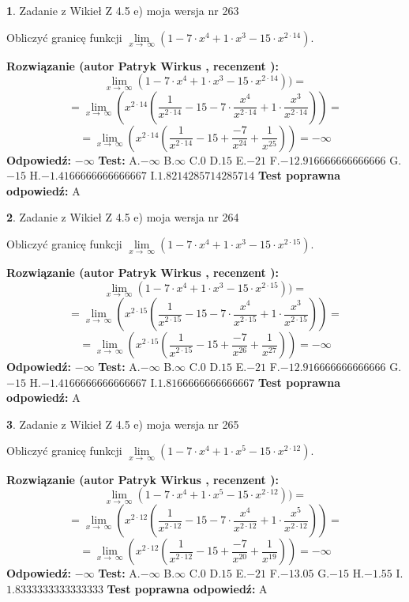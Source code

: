 \documentclass[12pt, a4paper]{article}
\theoremstyle{definition} %
\newtheorem{zad}{}
\newcommand{\zadStart}[1]{\begin{zad}#1\newline}
\newcommand{\zadStop}{\end{zad}}
\newcommand{\rozwStart}[2]{\noindent \textbf{Rozwiązanie (autor #1 , recenzent #2): }\newline}
\newcommand{\rozwStop}{\newline}
\newcommand{\odpStart}{\noindent \textbf{Odpowiedź:}\newline}
\newcommand{\odpStop}{\newline}
\newcommand{\testStart}{\noindent \textbf{Test:}\newline}
\newcommand{\testStop}{\newline}
\newcommand{\kluczStart}{\noindent \textbf{Test poprawna odpowiedź:}\newline}
\newcommand{\kluczStop}{\newline}
\begin{document}
\zadStart{Zadanie z Wikieł Z 4.5 e) moja wersja nr 263}


Obliczyć granicę funkcji  $\lim\limits_{x\to\ \infty}(1 - 7 \cdot x^{4}+1 \cdot x^{3}- 15 \cdot x^{2\cdot14})$.
\zadStop
\rozwStart{Patryk Wirkus}{}
$$\lim\limits_{x\to\ \infty}(1 - 7 \cdot x^{4}+1 \cdot x^{3}- 15 \cdot x^{2\cdot14}))=$$
$$=\lim\limits_{x\to\ \infty}(x^{2\cdot14}(\frac{1}{x^{2\cdot14}}-15 -7 \cdot \frac{x^{4}}{x^{2\cdot14}}+1 \cdot \frac{x^{3}}{x^{2\cdot14}}))=$$
$$=\lim\limits_{x\to\ \infty}(x^{2\cdot14}(\frac{1}{x^{2\cdot14}}-15 + \frac{-7}{x^{24}}+ \frac{1}{x^{25}}))=-\infty$$
\rozwStop
\odpStart
$-\infty$
\odpStop
\testStart
A.$-\infty$ B.$\infty$ C.$0$ D.$15$ E.$-21$
F.$-12.916666666666666$ G.$-15$
H.$-1.4166666666666667$
I.$1.8214285714285714$
\testStop
\kluczStart
A
\kluczStop



\zadStart{Zadanie z Wikieł Z 4.5 e) moja wersja nr 264}


Obliczyć granicę funkcji  $\lim\limits_{x\to\ \infty}(1 - 7 \cdot x^{4}+1 \cdot x^{3}- 15 \cdot x^{2\cdot15})$.
\zadStop
\rozwStart{Patryk Wirkus}{}
$$\lim\limits_{x\to\ \infty}(1 - 7 \cdot x^{4}+1 \cdot x^{3}- 15 \cdot x^{2\cdot15}))=$$
$$=\lim\limits_{x\to\ \infty}(x^{2\cdot15}(\frac{1}{x^{2\cdot15}}-15 -7 \cdot \frac{x^{4}}{x^{2\cdot15}}+1 \cdot \frac{x^{3}}{x^{2\cdot15}}))=$$
$$=\lim\limits_{x\to\ \infty}(x^{2\cdot15}(\frac{1}{x^{2\cdot15}}-15 + \frac{-7}{x^{26}}+ \frac{1}{x^{27}}))=-\infty$$
\rozwStop
\odpStart
$-\infty$
\odpStop
\testStart
A.$-\infty$ B.$\infty$ C.$0$ D.$15$ E.$-21$
F.$-12.916666666666666$ G.$-15$
H.$-1.4166666666666667$
I.$1.8166666666666667$
\testStop
\kluczStart
A
\kluczStop



\zadStart{Zadanie z Wikieł Z 4.5 e) moja wersja nr 265}


Obliczyć granicę funkcji  $\lim\limits_{x\to\ \infty}(1 - 7 \cdot x^{4}+1 \cdot x^{5}- 15 \cdot x^{2\cdot12})$.
\zadStop
\rozwStart{Patryk Wirkus}{}
$$\lim\limits_{x\to\ \infty}(1 - 7 \cdot x^{4}+1 \cdot x^{5}- 15 \cdot x^{2\cdot12}))=$$
$$=\lim\limits_{x\to\ \infty}(x^{2\cdot12}(\frac{1}{x^{2\cdot12}}-15 -7 \cdot \frac{x^{4}}{x^{2\cdot12}}+1 \cdot \frac{x^{5}}{x^{2\cdot12}}))=$$
$$=\lim\limits_{x\to\ \infty}(x^{2\cdot12}(\frac{1}{x^{2\cdot12}}-15 + \frac{-7}{x^{20}}+ \frac{1}{x^{19}}))=-\infty$$
\rozwStop
\odpStart
$-\infty$
\odpStop
\testStart
A.$-\infty$ B.$\infty$ C.$0$ D.$15$ E.$-21$
F.$-13.05$ G.$-15$
H.$-1.55$
I.$1.8333333333333333$
\testStop
\kluczStart
A
\kluczStop
\end{document}

